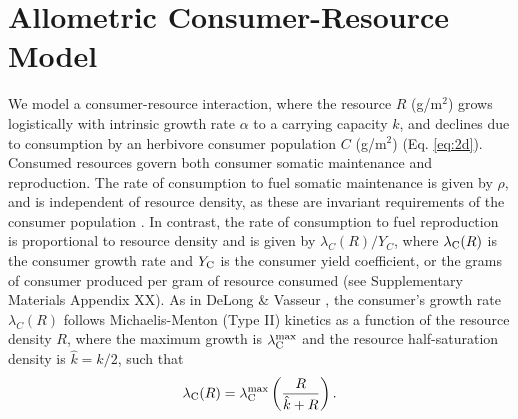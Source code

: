 \documentclass[]{rsos}%
\begin{document}
\section{Allometric Consumer-Resource Model}
We model a consumer-resource interaction, where the resource $R$ (g/m${}^2$) grows logistically with intrinsic growth rate $\alpha$ to a carrying capacity $k$, and declines due to consumption by an herbivore consumer population $C$ (g/m${}^2$) (Eq. \ref{eq:2d}).
Consumed resources govern both consumer somatic maintenance and reproduction. 
The rate of consumption to fuel somatic maintenance is given by $\rho$, and is independent of resource density, as these are invariant requirements of the consumer population \cite{yeakel2018dynamics}.
In contrast, the rate of consumption to fuel reproduction is proportional to resource density and is given by $\lambda_C(R)/Y_C$, where $\lambda_{\rm C}(R)$ is the consumer growth rate and $Y_{\rm C}$ is the consumer yield coefficient, or the grams of consumer produced per gram of resource consumed (see Supplementary Materials Appendix XX).
As in DeLong \& Vasseur \cite{DeLong:2012fjb}, the consumer's growth rate $\lambda_C(R)$ follows Michaelis-Menton (Type II) kinetics as a function of the resource density $R$, where the maximum growth is $\lambda^{\rm max}_{\rm C}$ and the resource half-saturation density is $\hat{k} = k/2$, such that 
\begin{equation}
    \lambda_{\rm C}(R) = \lambda^{\rm max}_{\rm C}\left(\frac{R}{\hat{k}+R}\right).
\end{equation}
\end{document}
